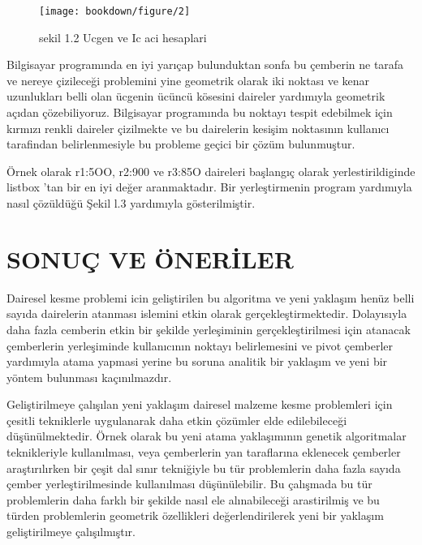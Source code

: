 \documentclass[]{book}
\begin{document}
\begin{figure}

{\centering \texttt{[image: bookdown/figure/2]} 

}

\caption{sekil 1.2 Ucgen  ve Ic aci hesaplari}\label{fig:pressure1}
\end{figure}

Bilgisayar programında en iyi yarıçap bulunduktan sonfa bu çemberin ne tarafa ve nereye çizileceği problemini yine geometrik olarak iki noktası ve kenar uzunlukları belli olan ücgenin ücüncü kösesini daireler yardımıyla geometrik açıdan çözebiliyoruz. Bilgisayar programında bu noktayı tespit edebilmek için kırmızı renkli daireler çizilmekte ve bu dairelerin kesişim noktasının kullanıcı tarafindan belirlenmesiyle bu probleme geçici bir çözüm bulunmuştur.

Örnek olarak r1:5OO, r2:900 ve r3:85O daireleri başlangıç olarak yerlestirildiginde listbox 'tan bir en iyi değer aranmaktadır. Bir yerleştirmenin program yardımıyla nasıl çözüldüğü Şekil l.3 yardımıyla gösterilmiştir.

\hypertarget{sonuc-ve-oneriler}{%
\chapter{SONUÇ VE ÖNERİLER}\label{sonuc-ve-oneriler}}

Dairesel kesme problemi icin geliştirilen bu algoritma ve yeni yaklaşım henüz belli sayıda dairelerin atanması islemini etkin olarak gerçekleştirmektedir. Dolayısıyla daha fazla cemberin etkin bir şekilde yerleşiminin gerçekleştirilmesi için atanacak çemberlerin yerleşiminde kullanıcının noktayı belirlemesini ve pivot çemberler yardımıyla atama yapmasi yerine bu soruna analitik bir yaklaşım ve yeni bir yöntem bulunması kaçınılmazdır.

Geliştirilmeye çalışılan yeni yaklaşım dairesel malzeme kesme problemleri için çesitli tekniklerle uygulanarak daha etkin çözümler elde edilebileceği düşünülmektedir. Örnek olarak bu yeni atama yaklaşımının genetik algoritmalar teknikleriyle kullanılması, veya çemberlerin yan taraflarına eklenecek çemberler araştırılırken bir çeşit dal sınır tekniğiyle bu tür problemlerin daha fazla sayıda çember yerleştirilmesinde kullanılması düşünülebilir. Bu çalışmada bu tür problemlerin daha farklı bir şekilde nasıl ele alınabileceği arastirilmiş ve bu türden problemlerin geometrik özellikleri değerlendirilerek yeni bir yaklaşım geliştirilmeye çalışılmıştır.
\end{document}
